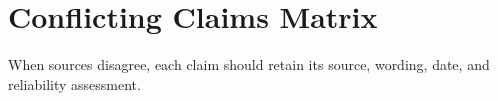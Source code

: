 \chapter{Conflicting Claims Matrix}


When sources disagree, each claim should retain its source, wording, date, and reliability assessment.


